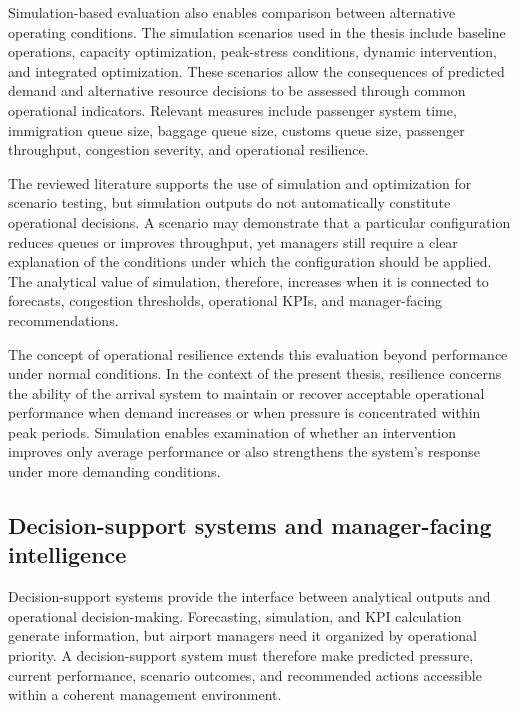 Simulation-based evaluation also enables comparison between alternative operating conditions. The simulation scenarios used in the thesis include baseline operations, capacity optimization, peak-stress conditions, dynamic intervention, and integrated optimization. These scenarios allow the consequences of predicted demand and alternative resource decisions to be assessed through common operational indicators. Relevant measures include passenger system time, immigration queue size, baggage queue size, customs queue size, passenger throughput, congestion severity, and operational resilience.

The reviewed literature supports the use of simulation and optimization for scenario testing, but simulation outputs do not automatically constitute operational decisions. A scenario may demonstrate that a particular configuration reduces queues or improves throughput, yet managers still require a clear explanation of the conditions under which the configuration should be applied. The analytical value of simulation, therefore, increases when it is connected to forecasts, congestion thresholds, operational KPIs, and manager-facing recommendations.

The concept of operational resilience extends this evaluation beyond performance under normal conditions. In the context of the present thesis, resilience concerns the ability of the arrival system to maintain or recover acceptable operational performance when demand increases or when pressure is concentrated within peak periods. Simulation enables examination of whether an intervention improves only average performance or also strengthens the system's response under more demanding conditions.

\subsection{Decision-support systems and manager-facing intelligence}
\label{subsec:decision-support-manager-facing}

Decision-support systems provide the interface between analytical outputs and operational decision-making. Forecasting, simulation, and KPI calculation generate information, but airport managers need it organized by operational priority. A decision-support system must therefore make predicted pressure, current performance, scenario outcomes, and recommended actions accessible within a coherent management environment.

